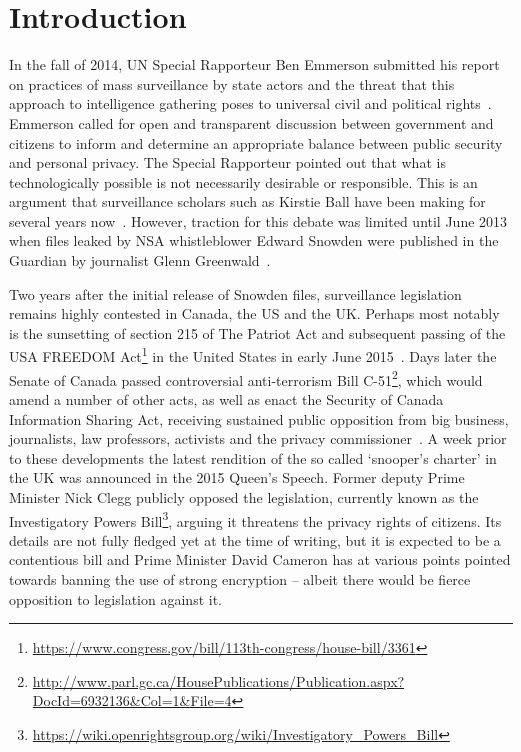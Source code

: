 \documentclass{llncs}
\begin{document}
\section{Introduction}
\label{sec:Introduction}
In the fall of 2014, UN Special Rapporteur Ben Emmerson submitted his report on practices of mass surveillance by state actors and the threat that this approach to intelligence gathering poses to universal civil and political rights~\cite{Emerson}. Emmerson called for open and transparent discussion between government and citizens to inform and determine an appropriate balance between public security and personal privacy. The Special Rapporteur pointed out that what is technologically possible is not necessarily desirable or responsible. This is an argument that surveillance scholars such as Kirstie Ball have been making for several years now~\cite{Ball}. However, traction for this debate was limited until June 2013 when files leaked by NSA whistleblower Edward Snowden were published in the Guardian by journalist Glenn Greenwald~\cite{Greenwald}.

Two years after the initial release of Snowden files, surveillance legislation remains highly contested in Canada, the US and the UK. Perhaps most notably is the sunsetting of section 215 of The Patriot Act and subsequent passing of the USA FREEDOM Act\footnote{\url{https://www.congress.gov/bill/113th-congress/house-bill/3361}} in the United States in early June 2015~\cite{Patriot}. Days later the Senate of Canada passed controversial anti-terrorism Bill C-51\footnote{\url{http://www.parl.gc.ca/HousePublications/Publication.aspx?DocId=6932136&Col=1&File=4}}, which would amend a number of other acts, as well as enact the Security of Canada Information Sharing Act, receiving sustained public opposition from big business, journalists, law professors, activists and the privacy commissioner~\cite{C-51}. A week prior to these developments the latest rendition of the so called `snooper's charter' in the UK was announced in the 2015 Queen's Speech. Former deputy Prime Minister Nick Clegg publicly opposed the legislation, currently known as the Investigatory Powers Bill\footnote{\url{https://wiki.openrightsgroup.org/wiki/Investigatory_Powers_Bill}}, arguing it threatens the privacy rights of citizens. Its details are not fully fledged yet at the time of writing, but it is expected to be a contentious bill and Prime Minister David Cameron has at various points pointed towards banning the use of strong encryption -- albeit there would be fierce opposition to legislation against it. 
\end{document}
